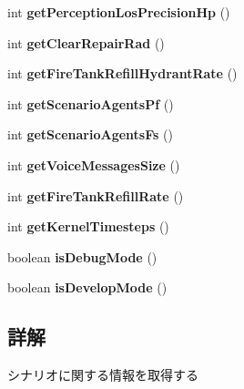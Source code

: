 \begin{DoxyCompactItemize}
int {\bfseries get\+Perception\+Los\+Precision\+Hp} ()
\item 
\hypertarget{classadf_1_1agent_1_1info_1_1ScenarioInfo_a8baf5ef7db802d247ed3c92ac6ecfc9f}{}\label{classadf_1_1agent_1_1info_1_1ScenarioInfo_a8baf5ef7db802d247ed3c92ac6ecfc9f} 
int {\bfseries get\+Clear\+Repair\+Rad} ()
\item 
\hypertarget{classadf_1_1agent_1_1info_1_1ScenarioInfo_abd07320e5d06141c929c0bdc02407e63}{}\label{classadf_1_1agent_1_1info_1_1ScenarioInfo_abd07320e5d06141c929c0bdc02407e63} 
int {\bfseries get\+Fire\+Tank\+Refill\+Hydrant\+Rate} ()
\item 
\hypertarget{classadf_1_1agent_1_1info_1_1ScenarioInfo_a5bf2de3e56110069391e8f7a7fee4aa0}{}\label{classadf_1_1agent_1_1info_1_1ScenarioInfo_a5bf2de3e56110069391e8f7a7fee4aa0} 
int {\bfseries get\+Scenario\+Agents\+Pf} ()
\item 
\hypertarget{classadf_1_1agent_1_1info_1_1ScenarioInfo_a857f7a6196944b4ad8f47bde5a162235}{}\label{classadf_1_1agent_1_1info_1_1ScenarioInfo_a857f7a6196944b4ad8f47bde5a162235} 
int {\bfseries get\+Scenario\+Agents\+Fs} ()
\item 
\hypertarget{classadf_1_1agent_1_1info_1_1ScenarioInfo_a2f1db5e455004c370c1a4c1c945b50bd}{}\label{classadf_1_1agent_1_1info_1_1ScenarioInfo_a2f1db5e455004c370c1a4c1c945b50bd} 
int {\bfseries get\+Voice\+Messages\+Size} ()
\item 
\hypertarget{classadf_1_1agent_1_1info_1_1ScenarioInfo_a12cb6450e037f4eb68c5e1026460bcb5}{}\label{classadf_1_1agent_1_1info_1_1ScenarioInfo_a12cb6450e037f4eb68c5e1026460bcb5} 
int {\bfseries get\+Fire\+Tank\+Refill\+Rate} ()
\item 
\hypertarget{classadf_1_1agent_1_1info_1_1ScenarioInfo_a52ab8da13a32eaba0149a63b0afe7c0a}{}\label{classadf_1_1agent_1_1info_1_1ScenarioInfo_a52ab8da13a32eaba0149a63b0afe7c0a} 
int {\bfseries get\+Kernel\+Timesteps} ()
\item 
\hypertarget{classadf_1_1agent_1_1info_1_1ScenarioInfo_a4442f0a3a58c14a7e869d197146100ca}{}\label{classadf_1_1agent_1_1info_1_1ScenarioInfo_a4442f0a3a58c14a7e869d197146100ca} 
boolean {\bfseries is\+Debug\+Mode} ()
\item 
\hypertarget{classadf_1_1agent_1_1info_1_1ScenarioInfo_a85b85ec035ea3cbe7f8440b4f44b53b1}{}\label{classadf_1_1agent_1_1info_1_1ScenarioInfo_a85b85ec035ea3cbe7f8440b4f44b53b1} 
boolean {\bfseries is\+Develop\+Mode} ()
\end{DoxyCompactItemize}


\subsection{詳解}
シナリオに関する情報を取得する 


